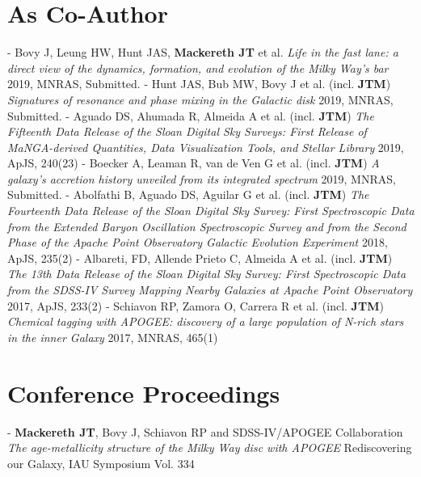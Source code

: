 \documentclass[margin]{res}
\begin{document}
\begin{resume}
\section{As Co-Author}
- Bovy J, Leung HW, Hunt JAS, \textbf{Mackereth JT} et al. \emph{Life in the fast lane: a direct view of the dynamics, formation, and evolution of the Milky Way's bar} 2019, MNRAS, Submitted. 
\newline - Hunt JAS, Bub MW, Bovy J et al. (incl. \textbf{JTM}) \emph{Signatures of resonance and phase mixing in the Galactic disk} 2019, MNRAS, Submitted.
\newline - Aguado DS, Ahumada R, Almeida A et al. (incl. \textbf{JTM}) \emph{The Fifteenth Data Release of the Sloan Digital Sky Surveys: First Release of MaNGA-derived Quantities, Data Visualization Tools, and Stellar Library} 2019, ApJS, 240(23)
\newline - Boecker A, Leaman R, van de Ven G et al. (incl. \textbf{JTM}) \emph{A galaxy's accretion history unveiled from its integrated spectrum} 2019, MNRAS, Submitted.
\newline - Abolfathi B, Aguado DS, Aguilar G et al. (incl. \textbf{JTM}) \emph{The Fourteenth Data Release of the Sloan Digital Sky Survey: First Spectroscopic Data from the Extended Baryon Oscillation Spectroscopic Survey and from the Second Phase of the Apache Point Observatory Galactic Evolution Experiment} 2018, ApJS, 235(2)
\newline - Albareti, FD, Allende Prieto C, Almeida A et al. (incl. \textbf{JTM}) \emph{The 13th Data Release of the Sloan Digital Sky Survey: First Spectroscopic Data from the SDSS-IV Survey Mapping Nearby Galaxies at Apache Point Observatory} 2017, ApJS, 233(2)
\newline - Schiavon RP, Zamora O, Carrera R et al. (incl. \textbf{JTM}) \emph{Chemical tagging with APOGEE: discovery of a large population of N-rich stars in the inner Galaxy} 2017, MNRAS, 465(1)

\section{Conference Proceedings}
- \textbf{Mackereth JT}, Bovy J, Schiavon RP and SDSS-IV/APOGEE Collaboration \emph{The age-metallicity structure of the Milky Way disc with APOGEE} Rediscovering our Galaxy, IAU Symposium Vol. 334

\end{resume}
\end{document}
